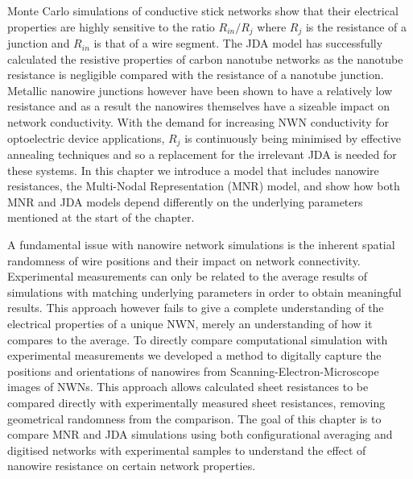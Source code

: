 Monte Carlo simulations of conductive stick networks show that their electrical properties are highly sensitive to the ratio $R_{in}/R_{j}$\cite{li2009,hicks2009,zezelj2012} where $R_j$ is the resistance of a junction and $R_{in}$ is that of a wire segment. The JDA model has successfully calculated the resistive properties of carbon nanotube networks as the nanotube resistance is negligible compared with the resistance of a nanotube junction\cite{nirmalraj2009,hecht2006}. Metallic nanowire junctions however have been shown to have a relatively low resistance\cite{bellew2015} and as a result the nanowires themselves have a sizeable impact on network conductivity. With the demand for increasing NWN conductivity for optoelectric device applications, $R_j$ is continuously being minimised by effective annealing techniques and so a replacement for the irrelevant JDA is needed for these systems. In this chapter we introduce a model that includes nanowire resistances, the Multi-Nodal Representation (MNR) model, and show how both MNR and JDA models depend differently on the underlying parameters mentioned at the start of the chapter.

A fundamental issue with nanowire network simulations is the inherent spatial randomness of wire positions and their impact on network connectivity. Experimental measurements can only be related to the average results of simulations with matching underlying parameters in order to obtain meaningful results\cite{mutiso2013}. This approach however fails to give a complete understanding of the electrical properties of a unique NWN, merely an understanding of how it compares to the average. To directly compare computational simulation with experimental measurements we developed a method to digitally capture the positions and orientations of nanowires from Scanning-Electron-Microscope images of NWNs. This approach allows calculated sheet resistances to be compared directly with experimentally measured sheet resistances, removing geometrical randomness from the comparison. The goal of this chapter is to compare MNR and JDA simulations using both configurational averaging and digitised networks with experimental samples to understand the effect of nanowire resistance on certain network properties.


